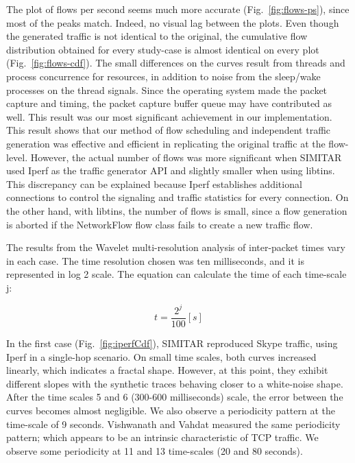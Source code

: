 The plot of flows per second seems much more accurate (Fig.~\ref{fig:flows-ps}), since most of the peaks match. Indeed, no visual lag between the plots. Even though the generated traffic is not identical to the original, the cumulative flow distribution obtained for every study-case is almost identical on every plot (Fig.~\ref{fig:flows-cdf}). The small differences on the curves result from threads and process concurrence for resources, in addition to noise from the sleep/wake processes on the thread signals. Since the operating system made the packet capture and timing, the packet capture buffer queue may have contributed as well. This result was our most significant achievement in our implementation. This result shows that our method of flow scheduling and independent traffic generation was effective and efficient in replicating the original traffic at the flow-level. However, the actual number of flows was more significant when SIMITAR used Iperf as the traffic generator API and slightly smaller when using libtins. This discrepancy can be explained because Iperf establishes additional connections to control the signaling and traffic statistics for every connection. On the other hand, with libtins, the number of flows is small, since a flow generation is aborted if the NetworkFlow flow class fails to create a new traffic flow. 

The results from the Wavelet multi-resolution analysis of inter-packet times vary in each case. The time resolution chosen was ten milliseconds, and it is represented in log 2 scale. The equation can calculate the time of each time-scale j: 

\begin{equation}
t = \frac{2^{j}}{100} [s]
\end{equation}

In the first case (Fig.~\ref{fig:iperfCdf}), SIMITAR reproduced Skype traffic, using Iperf in a single-hop scenario. On small time scales, both curves increased linearly, which indicates a fractal shape. However, at this point, they exhibit different slopes with the synthetic traces behaving closer to a white-noise shape. After the time scales 5 and 6 (300-600 milliseconds) scale, the error between the curves becomes almost negligible. We also observe a periodicity pattern at the time-scale of 9 seconds. Vishwanath and Vahdat\cite{swing-paper}  measured the same periodicity pattern; which appears to be an intrinsic characteristic of  TCP traffic. We observe some periodicity at 11 and 13 time-scales (20 and 80 seconds). 

